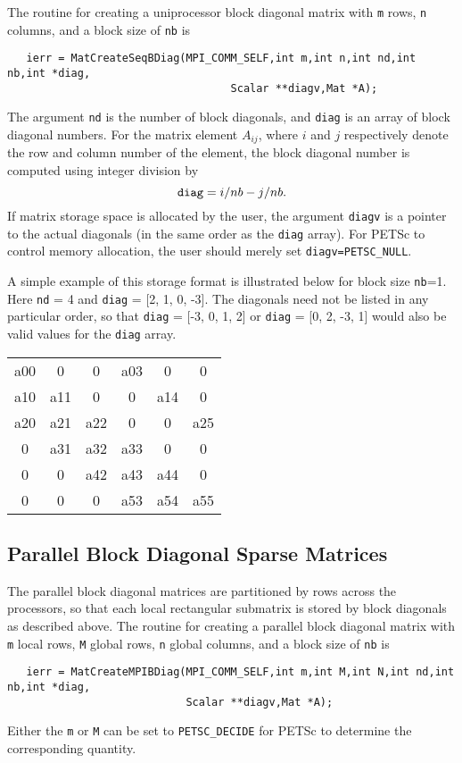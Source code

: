 The routine for creating a uniprocessor block diagonal matrix with {\tt m} 
rows, {\tt n} columns, and a block size of {\tt nb} is
\begin{verbatim}
   ierr = MatCreateSeqBDiag(MPI_COMM_SELF,int m,int n,int nd,int nb,int *diag,
                                   Scalar **diagv,Mat *A);
\end{verbatim}
The  argument {\tt nd} is the number of 
block diagonals, and {\tt diag} is
an array of block diagonal numbers.  For the matrix element $A_{ij}$,
where $i$ and $j$ respectively denote the row and column number of the 
element, the block diagonal number is computed using integer division by
\[ {\tt diag} = i/nb - j/nb. \]
If matrix storage space is allocated by the user, the argument {\tt diagv} 
is a pointer to the actual diagonals (in the same order as the {\tt diag} 
array).  For PETSc to control memory allocation, the user should merely
set {\tt diagv=PETSC\_NULL}.

A simple example of this storage format is illustrated below for block
size {\tt nb}=1. 
Here {\tt nd} = 4 and {\tt diag} = [2, 1, 0, -3]. The
diagonals need not be listed in any particular order, so that
{\tt diag} = [-3, 0, 1, 2] or {\tt diag} = [0, 2, -3, 1] would also
be valid values for the {\tt diag} array. 

\begin{center}
\begin{tabular}{| c c c c c c |}
\hline
a00  &0    &0    &a03  &0    &0\\
a10  &a11  &0    &0    &a14  &0\\
a20  &a21  &a22  &0    &0    &a25\\
0    &a31  &a32  &a33  &0    &0\\
0    &0    &a42  &a43  &a44  &0\\
0    &0    &0    &a53  &a54  &a55\\
\hline
\end{tabular}
\end{center}

\subsection{Parallel Block Diagonal Sparse Matrices}

The parallel block diagonal matrices are partitioned by rows across
the processors, so that each local rectangular submatrix is stored by
block diagonals as described above.  The routine for creating a
parallel block diagonal matrix with {\tt m} local rows, {\tt M} global
rows, {\tt n} global columns, and a block size of {\tt nb} is
\begin{verbatim}
   ierr = MatCreateMPIBDiag(MPI_COMM_SELF,int m,int M,int N,int nd,int nb,int *diag,
                            Scalar **diagv,Mat *A);
\end{verbatim}
Either the {\tt m} or {\tt M} can be set to {\tt PETSC\_DECIDE} for PETSc
to determine the corresponding quantity.


